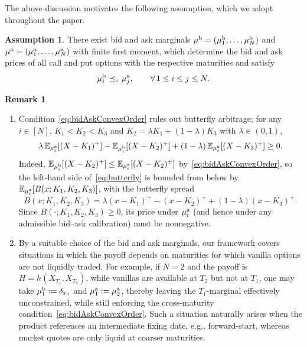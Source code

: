 \documentclass[11pt]{article}
\theoremstyle{plain}
\theoremstyle{definition}
\newtheorem{remark}[theorem]{Remark}
\newtheorem{assumption}[theorem]{Assumption}
\theoremstyle{remark}
\newcommand{\E}{\mathbb{E}}
\DeclareMathOperator{\cleq}{\,\preceq_{\rm c}\,}
\theoremstyle{plain}
\begin{document}
The above discussion motivates the following assumption, which we adopt throughout the paper.

\begin{assumption}\label{asm:bidAskConvexOrder}
There exist bid and ask marginals $\mu^{\rm b}=(\mu^{\rm b}_1,\ldots,\mu^{\rm b}_N)$ and $\mu^{\rm a}=(\mu^{\rm a}_1,\ldots,\mu^{\rm a}_N)$ with finite first moment, which determine the bid and ask prices of all call and put options with the respective maturities and satisfy
\begin{equation}\label{eq:bidAskConvexOrder}
\mu_i^{\rm b}\cleq \mu_j^{\rm a}, \qquad \forall\, 1\leq i \leq j \leq N .
\end{equation}
\end{assumption}

\begin{remark}
\begin{enumerate}[label=(\alph*)]
\item 
Condition~\eqref{eq:bidAskConvexOrder} rules out butterfly arbitrage;  for any $i\in[N]$, $K_1<K_2<K_3$ and $K_2=\lambda K_1+(1-\lambda)K_3$ with $\lambda\in(0,1)$, 
\begin{equation}\label{eq:butterfly}
\lambda\, \E_{\mu_i^{\rm a}}[(X-K_1)^+] - \E_{\mu_i^{\rm b}}[(X-K_2)^+] + (1-\lambda)\, \E_{\mu_i^{\rm a}}[(X-K_3)^+] \geq 0.
\end{equation}
Indeed, $\E_{\mu_i^{\rm b}}[(X-K_2)^+] \leq \E_{\mu_i^{\rm a}}[(X-K_2)^+]$ by~\eqref{eq:bidAskConvexOrder}, so the left-hand side of~\eqref{eq:butterfly} is bounded from below by
$\E_{\mu_i^{\rm a}}[B(x;K_1,K_2,K_3)]$, with the butterfly spread  
$$B(x;K_1,K_2,K_3)=\lambda (x-K_1)^+-(x-K_2)^++(1-\lambda)(x-K_3)^+.$$ Since $B(\cdot;K_1,K_2,K_3)\geq 0$, its price under $\mu_i^{\rm a}$ (and hence under any admissible bid--ask calibration) must be nonnegative.
%
%
%
%
%
%
%
%

\item By a suitable choice of the bid and ask marginals, our framework covers situations in which the payoff depends on maturities for which vanilla options are not liquidly traded. For example, if $N=2$ and the payoff is $H=h(X_{T_1},X_{T_2})$, while vanillas are available at $T_2$ but not at $T_1$, one may take $\mu^{\rm b}_1:=\delta_{x_0}$ and $\mu^{\rm a}_1:=\mu^{\rm a}_2$, thereby leaving the $T_1$-marginal effectively unconstrained, while still enforcing the cross-maturity condition~\eqref{eq:bidAskConvexOrder}. Such a situation naturally arises when the product references an intermediate fixing date, e.g., forward-start, whereas market quotes are only liquid at coarser maturities.
\end{enumerate}
\end{remark}
\end{document}
